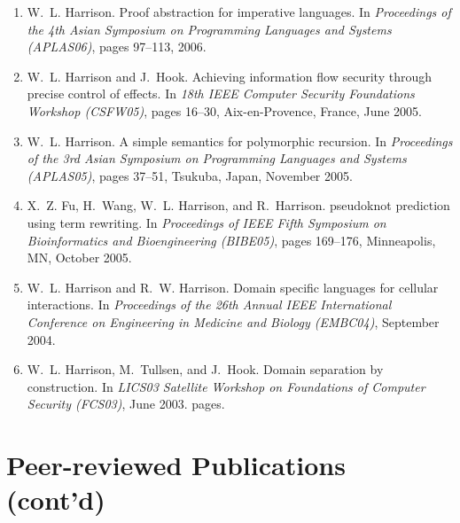 \documentclass[11pt]{article}
\begin{document}
\begin{enumerate}[leftmargin=0.0mm,resume]
\item
W.~L. Harrison.
\newblock Proof abstraction for imperative languages.
\newblock In {\em Proceedings of the 4th Asian Symposium on Programming
  Languages and Systems (APLAS06)}, pages 97--113, 2006.

\item
W.~L. Harrison and J.~Hook.
\newblock Achieving information flow security through precise control of
  effects.
\newblock In {\em 18th IEEE Computer Security Foundations Workshop (CSFW05)},
  pages 16--30, Aix-en-Provence, France, June 2005.

\item
W.~L. Harrison.
\newblock A simple semantics for polymorphic recursion.
\newblock In {\em Proceedings of the 3rd Asian Symposium on Programming
  Languages and Systems (APLAS05)}, pages 37--51, Tsukuba, Japan, November
  2005.

\item
X.~Z. Fu, H.~Wang, W.~L. Harrison, and R.~Harrison.
 pseudoknot prediction using term rewriting.
\newblock In {\em Proceedings of IEEE Fifth Symposium on Bioinformatics and
  Bioengineering (BIBE05)}, pages 169--176, Minneapolis, MN, October 2005.

\item
W.~L. Harrison and R.~W. Harrison.
\newblock Domain specific languages for cellular interactions.
\newblock In {\em Proceedings of the 26th Annual IEEE International Conference
  on Engineering in Medicine and Biology (EMBC04)}, September 2004.

\item
W.~L. Harrison, M.~Tullsen, and J.~Hook.
\newblock Domain separation by construction.
\newblock In {\em LICS03 Satellite Workshop on Foundations of Computer Security
  (FCS03)}, June 2003.
 pages.

\end{enumerate}

\section{Peer-reviewed Publications (cont'd)}
\end{document}
